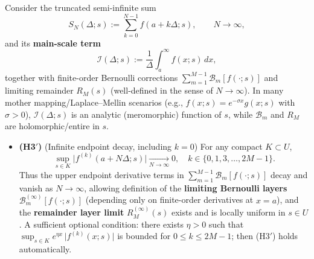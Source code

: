 \documentclass[11pt,a4paper]{article}
\theoremstyle{remark}
\begin{document}
Consider the truncated semi-infinite sum
\begin{equation}
S_N(\Delta;s):=\sum_{k=0}^{N-1} f(a+k\Delta;s),\qquad N\to\infty,
\end{equation}
and its \textbf{main-scale term}
\begin{equation}
\mathcal{I}(\Delta;s):=\frac{1}{\Delta}\int_a^{\infty} f(x;s)\,dx,
\end{equation}
together with finite-order Bernoulli corrections $\sum_{m=1}^{M-1}\mathcal{B}_m[f(\cdot;s)]$ and limiting remainder $R_M(s)$ (well-defined in the sense of $N\to\infty$). In many mother mapping/Laplace--Mellin scenarios (e.g., $f(x;s)=e^{-\sigma x}g(x;s)$ with $\sigma>0$), $\mathcal{I}(\Delta;s)$ is an analytic (meromorphic) function of $s$, while $\mathcal{B}_m$ and $R_M$ are holomorphic/entire in $s$.

\begin{itemize}
\item \textbf{(H3$'$)} (Infinite endpoint decay, including $k=0$) For any compact $K\subset U$,
\begin{equation}
\sup_{s\in K}\big|f^{(k)}(a+N\Delta;s)\big|\xrightarrow[N\to\infty]{}0,\quad k\in\{0,1,3,\dots,2M-1\}.
\end{equation}
Thus the upper endpoint derivative terms in $\sum_{m=1}^{M-1}\mathcal{B}_m[f(\cdot;s)]$ decay and vanish as $N\to\infty$, allowing definition of the \textbf{limiting Bernoulli layers} $\mathcal{B}_m^{(\infty)}[f(\cdot;s)]$ (depending only on finite-order derivatives at $x=a$), and the \textbf{remainder layer limit} $R_M^{(\infty)}(s)$ exists and is locally uniform in $s\in U$. A sufficient optional condition: there exists $\eta>0$ such that $\sup_{s\in K} e^{\eta x}\,\big|f^{(k)}(x;s)\big|$ is bounded for $0\le k\le 2M-1$; then (H3$'$) holds automatically.
\end{itemize}
\end{document}
